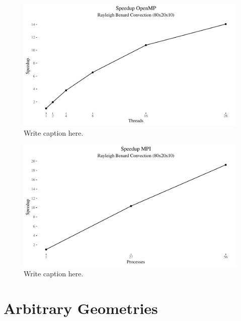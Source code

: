 \documentclass{article}%
\begin{document}
\begin{figure}[htb]
\centering
\includegraphics[width=1\linewidth]{../tests/graphs/speedup_OpenMP_double.pdf}
\caption{Write caption here.}
\label{fig:speedup_openmp}
\end{figure}

\begin{figure}[htb]
\centering
\includegraphics[width=1\linewidth]{../tests/graphs/speedup_MPI.pdf}
\caption{Write caption here.}
\label{fig:speedup_MPI}
\end{figure}




\section{Arbitrary Geometries}
\end{document}
